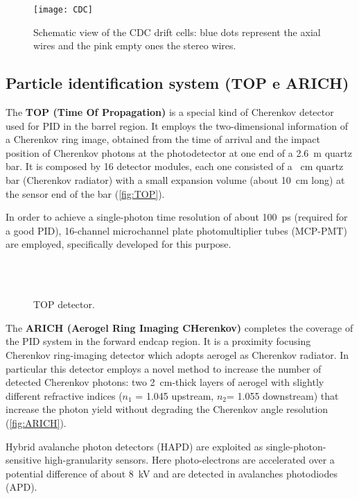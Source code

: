 \begin{figure}[h!]
\centering
\texttt{[image: CDC]}
\caption{Schematic view of the CDC drift cells: blue dots represent the axial wires and the pink empty ones the stereo wires.}
\label{fig:CDC}
\end{figure}


\subsection{Particle identification system (TOP e ARICH)}

The \textbf{TOP (Time Of Propagation)} is a special kind of Cherenkov detector used for PID in the barrel region. It employs the two-dimensional information of a Cherenkov ring image, obtained from the time of arrival and the impact position of Cherenkov photons at the photodetector at one end of a \SI{2.6}{m} quartz bar. It is composed by 16 detector modules, each one consisted of a ~\unit{cm} quartz bar (Cherenkov radiator) with a small expansion volume (about \SI{10}{cm} long) at the sensor end of the bar (\autoref{fig:TOP}). 

In order to achieve a single-photon time resolution of about \SI{100}{ps} (required for a good PID), 16-channel microchannel plate photomultiplier tubes (MCP-PMT) are employed, specifically developed for this purpose.\\

\begin{figure}[h!]
\centering
{}\\
\\
\caption{TOP detector.}
\label{fig:TOP}
\end{figure}

The \textbf{ARICH (Aerogel Ring Imaging CHerenkov)} completes the coverage of the PID system in the forward endcap region. It is a proximity focusing Cherenkov ring-imaging detector which adopts aerogel as Cherenkov radiator. In particular this detector employs a novel method to increase the number of detected Cherenkov photons: two \SI{2}{cm}-thick layers of aerogel with slightly different refractive indices ($n_{1}$ = 1.045 upstream, $n_{2}$= 1.055 downstream) that increase the photon yield without degrading the Cherenkov angle resolution (\autoref{fig:ARICH}).

Hybrid avalanche photon detectors (HAPD) are exploited as single-photon-sensitive high-granularity sensors. Here photo-electrons are accelerated over a potential difference of about \SI{8}{\kilo V} and are detected in avalanches photodiodes (APD).\\

